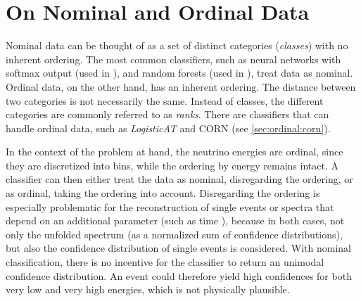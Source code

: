 \section{On Nominal and Ordinal Data}
Nominal data can be thought of as a set of distinct categories
  (\emph{classes})
with no inherent ordering.
The most common classifiers,
  such as
    neural networks with softmax output (used in \cite{dsea_samuel}),
    and random forests (used in \cite{hymon2021seasonal}),
treat data as nominal.
%
Ordinal data, on the other hand,
has an inherent ordering.
The distance between two categories is not necessarily the same. %
Instead of classes,
  the different categories are commonly referred to as \emph{ranks}.
There are classifiers that can handle ordinal data,
such as
  \emph{LogisticAT} \cite{logisticat, dsea_jan} %
  and \ac{CORN} (see \autoref{sec:ordinal:corn}).

In the context of the problem at hand,
  the neutrino energies are ordinal,
    since they are discretized into bins,
      while the ordering by energy remains intact.
%
A classifier can then either
  treat the data as nominal,
    disregarding the ordering,
  or as ordinal,
    taking the ordering into account.
Disregarding the ordering
is especially problematic for the reconstruction of
  single events
  or spectra that depend on an additional parameter
    (such as time \cite{hymon2021seasonal}),
because in both cases,
  not only the unfolded spectrum
    (as a normalized sum of confidence distributions),
  but also the confidence distribution of single events
  is considered.
With nominal classification,
  there is no incentive for the classifier
    to return an unimodal confidence distribution.
An event could therefore yield
  high confidences for both very low and very high energies,
  which is not physically plausible.



